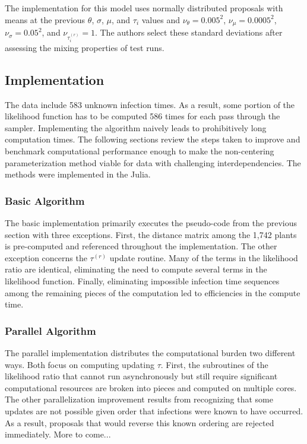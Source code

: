 \documentclass{uwstat572}
\begin{document}
The implementation for this model uses normally distributed proposals with means at the previous $\theta$, $\sigma$, $\mu$, and $\tau_i$ values and $ \nu_{\theta}=0.005^2$, $ \nu_{\mu}=0.0005^2$, $ \nu_{\sigma}=0.05^2$, and $ \nu_{\tau^{(r)}_i}=1$. 
The authors select these standard deviations after assessing the mixing properties of test runs. 

\subsection{Implementation}
The data include 583 unknown infection times. 
As a result, some portion of the likelihood function has to be computed 586 times for each pass through the sampler. 
Implementing the algorithm naively leads to prohibitively long computation times. 
The following sections review the steps taken to improve and benchmark computational performance enough to make the non-centering parameterization method viable for data with challenging interdependencies. 
The methods were implemented in the Julia. 

\subsubsection{Basic Algorithm}
The basic implementation primarily executes the pseudo-code from the previous section with three exceptions.
First, the distance matrix among the 1,742 plants is pre-computed and referenced throughout the implementation. 
The other exception concerns the $\tau^{(r)}$ update routine. 
Many of the terms in the likelihood ratio are identical, eliminating the need to compute several terms in the likelihood function. 
Finally, eliminating impossible infection time sequences among the remaining pieces of the computation led to efficiencies in the compute time.

\subsubsection{Parallel Algorithm}
The parallel implementation distributes the computational burden two different ways. 
Both focus on computing updating $\tau$. 
First, the subroutines of the likelihood ratio that cannot run asynchronously but still require significant computational resources are broken into pieces and computed on multiple cores. 
The other parallelization improvement results from recognizing that some updates are not possible given order that infections were known to have occurred. 
As a result, proposals that would reverse this known ordering are rejected immediately. 
More to come... 
\end{document}
